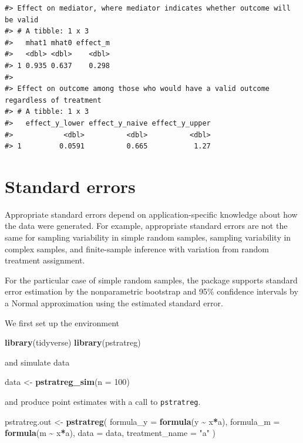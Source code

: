 \documentclass[
]{book}
\newenvironment{Shaded}{\begin{snugshade}}{\end{snugshade}}
\newcommand{\AttributeTok}[1]{\textcolor[rgb]{0.13,0.29,0.53}{#1}}
\newcommand{\DecValTok}[1]{\textcolor[rgb]{0.00,0.00,0.81}{#1}}
\newcommand{\FunctionTok}[1]{\textcolor[rgb]{0.13,0.29,0.53}{\textbf{#1}}}
\newcommand{\NormalTok}[1]{#1}
\newcommand{\OtherTok}[1]{\textcolor[rgb]{0.56,0.35,0.01}{#1}}
\newcommand{\SpecialCharTok}[1]{\textcolor[rgb]{0.81,0.36,0.00}{\textbf{#1}}}
\newcommand{\StringTok}[1]{\textcolor[rgb]{0.31,0.60,0.02}{#1}}
\begin{document}
\begin{verbatim}
#> Effect on mediator, where mediator indicates whether outcome will be valid
#> # A tibble: 1 x 3
#>   mhat1 mhat0 effect_m
#>   <dbl> <dbl>    <dbl>
#> 1 0.935 0.637    0.298
#> 
#> Effect on outcome among those who would have a valid outcome regardless of treatment
#> # A tibble: 1 x 3
#>   effect_y_lower effect_y_naive effect_y_upper
#>            <dbl>          <dbl>          <dbl>
#> 1         0.0591          0.665           1.27
\end{verbatim}

\hypertarget{standard-errors}{%
\chapter{Standard errors}\label{standard-errors}}

Appropriate standard errors depend on application-specific knowledge about how the data were generated. For example, appropriate standard errors are not the same for sampling variability in simple random samples, sampling variability in complex samples, and finite-sample inference with variation from random treatment assignment.

For the particular case of simple random samples, the package supports standard error estimation by the nonparametric bootstrap and 95\% confidence intervals by a Normal approximation using the estimated standard error.

We first set up the environment

\begin{Shaded}
\begin{Highlighting}[]
\FunctionTok{library}\NormalTok{(tidyverse)}
\FunctionTok{library}\NormalTok{(pstratreg)}
\end{Highlighting}
\end{Shaded}

and simulate data

\begin{Shaded}
\begin{Highlighting}[]
\NormalTok{data }\OtherTok{\textless{}{-}} \FunctionTok{pstratreg\_sim}\NormalTok{(}\AttributeTok{n =} \DecValTok{100}\NormalTok{)}
\end{Highlighting}
\end{Shaded}

and produce point estimates with a call to \texttt{pstratreg}.

\begin{Shaded}
\begin{Highlighting}[]
\NormalTok{pstratreg.out }\OtherTok{\textless{}{-}} \FunctionTok{pstratreg}\NormalTok{(}
  \AttributeTok{formula\_y =} \FunctionTok{formula}\NormalTok{(y }\SpecialCharTok{\textasciitilde{}}\NormalTok{ x}\SpecialCharTok{*}\NormalTok{a),}
  \AttributeTok{formula\_m =} \FunctionTok{formula}\NormalTok{(m }\SpecialCharTok{\textasciitilde{}}\NormalTok{ x}\SpecialCharTok{*}\NormalTok{a),}
  \AttributeTok{data =}\NormalTok{ data,}
  \AttributeTok{treatment\_name =} \StringTok{"a"}
\NormalTok{)}
\end{Highlighting}
\end{Shaded}
\end{document}
